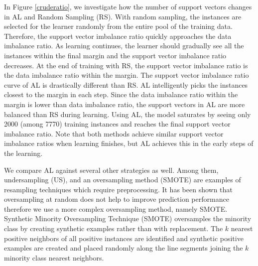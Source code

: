 In Figure \ref{cruderatio}, we investigate how the number of support vectors changes in AL and Random Sampling (RS). With random sampling, the instances are selected for the learner randomly from the entire pool of the training data. Therefore, the support vector imbalance ratio quickly approaches the data imbalance ratio. As learning continues, the learner should gradually see all the instances within the final margin and the support vector imbalance ratio decreases. At the end of training with RS, the support vector imbalance ratio is the data imbalance ratio within the margin. The support vector imbalance ratio curve of AL is drastically different than RS. AL intelligently picks the instances closest to the margin in each step. Since the data imbalance ratio within the margin is lower than data imbalance ratio, the support vectors in AL are more balanced than RS during learning. Using AL, the model saturates by seeing only 2000 (among 7770) training instances and reaches the final support vector imbalance ratio. Note that both methods achieve similar support vector imbalance ratios when learning finishes, but AL achieves this in the early steps of the learning.

We compare AL against several other strategies as well. Among them, undersampling (US), and an oversampling method (SMOTE) are examples of resampling techniques which require preprocessing. It has been shown that oversampling at random does not help to improve prediction performance \cite{Japkowicz_2002} therefore we use a more complex oversampling method, namely SMOTE.  Synthetic Minority Oversampling Technique (SMOTE) oversamples the minority class by creating synthetic examples rather than with replacement. The $k$ nearest positive neighbors of all positive instances are identified and synthetic positive examples are created and placed randomly along the line segments joining the $k$ minority class nearest neighbors.

